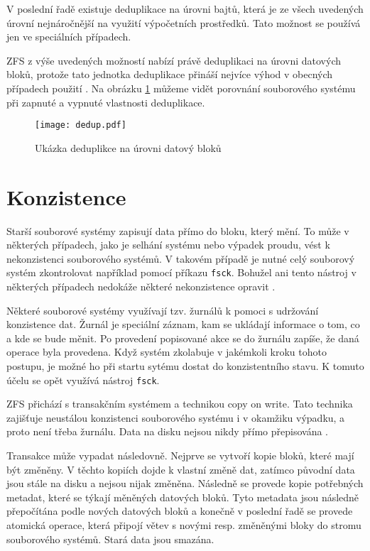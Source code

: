 V poslední řadě existuje deduplikace na úrovni bajtů, která je ze všech uvedených úrovní nejnáročnější na využití výpočetních prostředků. Tato možnost se používá jen ve speciálních případech.

ZFS z výše uvedených možností nabízí právě deduplikaci na úrovni datových bloků, protože tato jednotka deduplikace přináší nejvíce výhod v obecných případech použití \cite{dedup}. Na obrázku \ref{blockdedup} můžeme vidět porovnání souborového systému při zapnuté a vypnuté vlastnosti deduplikace.
\begin{figure}[!h]
    \caption{Ukázka deduplikce na úrovni datový bloků}
    \label{blockdedup}
    \texttt{[image: dedup.pdf]}
\end{figure}
\section{Konzistence}
\label{consitence}
Starší souborové systémy zapisují data přímo do bloku, který mění. To může v některých případech, jako je selhání systému nebo výpadek proudu, vést k nekonzistenci souborového systémů. V takovém případě je nutné celý souborový systém zkontrolovat například pomocí příkazu \verb|fsck|. Bohužel ani tento nástroj v některých případech nedokáže některé nekonzistence opravit \cite{transaction}.

Některé souborové systémy využívají tzv. žurnálů k pomoci s udržování konzistence dat. Žurnál je speciální záznam, kam se ukládají informace o tom, co a kde se bude měnit. Po provedení popisované akce se do žurnálu zapíše, že daná operace byla provedena. Když systém zkolabuje v jakémkoli kroku tohoto postupu, je možné ho při startu sytému dostat do konzistentního stavu. K tomuto účelu se opět využívá nástroj \verb|fsck|.

ZFS přichází s transakčním systémem a technikou copy on write. Tato technika zajišťuje neustálou konzistenci souborového systému i v okamžiku výpadku, a proto není třeba žurnálu. Data na disku nejsou nikdy přímo přepisována \cite{transaction}.

Transakce může vypadat následovně. Nejprve se vytvoří kopie bloků, které mají být změněny. V těchto kopiích dojde k vlastní změně dat, zatímco původní data jsou stále na disku a nejsou nijak změněna. Následně se provede kopie potřebných metadat, které se týkají měněných datových bloků. Tyto metadata jsou následně přepočítána podle nových datových bloků a konečně v poslední řadě se provede atomická operace, která připojí větev s novými resp. změněnými bloky do stromu souborového systémů. Stará data jsou smazána.

